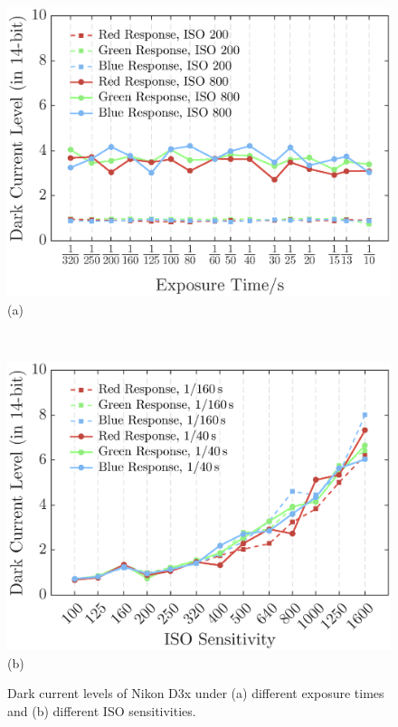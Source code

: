 \documentclass[9pt,twocolumn,twoside]{osajnl}
\providecommand{\DIFaddbeginFL}{} %
\providecommand{\DIFaddendFL}{} %
\providecommand{\DIFdelbeginFL}{} %
\providecommand{\DIFdelendFL}{} %
\begin{document}
	\begin{figure}[tbp]
		\centering
		\DIFdelbeginFL %
\DIFdelendFL \DIFaddbeginFL \begin{minipage}{0.7\linewidth}
			\DIFaddendFL \centering
			\includegraphics[width=\linewidth]{Fig1a}\\
			(a)
		\end{minipage}\\
		\vspace{0.5em}
		\DIFdelbeginFL %
\DIFdelendFL \DIFaddbeginFL \begin{minipage}{0.7\linewidth}
			\DIFaddendFL \centering
			\includegraphics[width=\linewidth]{Fig1b}\\
			(b)
		\end{minipage}
	\caption{Dark current levels of Nikon D3x under (a) different exposure times and (b) different ISO sensitivities.}
	\label{fig:1}
\end{figure}
\end{document}

